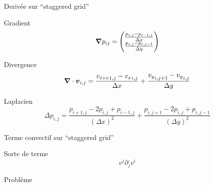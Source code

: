 \begin{frame}{Derivée sur ``staggered grid''}
\begin{block}{Gradient}
 \begin{equation*}
  {\boldsymbol {\nabla}}p_{ij}=\begin{pmatrix}
    \frac{p_{i,j}-p_{i-1,j}}{\Delta x}\\
    \frac{p_{i,j}-p_{i,j-1}}{\Delta y}\\
                      \end{pmatrix}
 \end{equation*}
\end{block}

\begin{block}{Divergence}
 \begin{equation*}
{\boldsymbol {\nabla}}\cdot {\boldsymbol {v}}_{i,j}=\frac{{v_{x}}_{i+1,j}-{v_{x}}_{i,j}}{\Delta x}+\frac{{v_{y}}_{i,j+1}-{v_{y}}_{i,j}}{\Delta y}
 \end{equation*}
\end{block}
 
 \begin{block}{Laplacien}
 \begin{equation*}
    \Delta p_{i,j}=\frac{p_{i+1,j}-2p_{i,j}+p_{i-1,j}}{(\Delta x)^2}+\frac{p_{i,j+1}-2p_{i,j}+p_{i,j-1}}{(\Delta y)^2}
   \end{equation*}
 \end{block}

 
\end{frame}

\begin{frame}{Terme convectif sur ``staggered grid''}
\begin{block}{Sorte de terme}
 \begin{equation*}
v^{j}\partial_{j}v^{i}
\end{equation*}
\end{block}
\begin{block}{Problème}
\end{block}

\end{frame}

